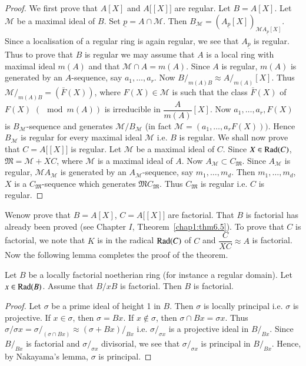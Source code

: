 \begin{proof}
We first prove that $A [X] $ and $A \big[[X]\big]$ are regular. Let
$B = A [X]$. Let $\mathscr{M}$ be a maximal ideal of
$B$. Set $\underline{p}= A \cap \mathscr{M}$. Then $B_\mathscr{M} =
(A_{\underline{p}} [X])_{\mathscr{M} A_{\underline{p}}[X]}$. Since a
localisation of a regular ring  is again regular, we see that
$A_{\underline{p}}$ is regular. Thus to prove that $B$ is regular we
may assume  that $A$ is a local ring with maximal ideal $m(A)$  and
that $\mathscr{M} \cap A = m(A)$. Since $A$ is regular, $m(A)$ is
generated by  an $A$-sequence, say $a_1, \ldots, a_r$. Now
$B/_{m(A)B} \approx A/_{m(A)} [X]$. Thus $\mathscr{M}/_{m (A)
    B} = (\bar{F}(X))$, where $F (X) \in \mathscr{M}$ is such that the
class $\bar{F}(X)$ of  $F(X)$ $(\mod m (A))$ is irreducible in
$\dfrac{A}{m (A)} [X]$. Now $a_1, \ldots , a_r, F(X)$ is
$B_\mathscr{M}$-sequence and generates $\mathscr{M} / B_\mathscr{M}$
(in fact $\mathscr{M}= (a_1, \ldots , a_r F(X)))$. Hence
$B_\mathscr{M}$ is regular for every maximal ideal $\mathscr{M}$
i.e. $B$ is regular. We shall now prove that $C = A \big[[X]\big]$ is
regular. Let $\mathscr{M}$ be a maximal ideal of $C$. Since $X \in
\operatorname{Rad} (C)$, $\mathfrak{M} = \mathscr{M} + X C$, where $\mathscr{M}$ is a
maximal ideal of $A$. Now $A_\mathscr{M} \subset
C_{\mathfrak{M}}$. Since $A_\mathscr{M}$ is regular, $\mathscr{M}
A_\mathscr{M}$ is generated by an $A_\mathscr{M}$-sequence, say $m_1,
\ldots , m_d$. Then $m_1, \ldots , m_d$, $X$ is a 
$C_\mathfrak{M}$-sequence which generates $\mathfrak{M}
C_\mathfrak{M}$. Thus $C_\mathfrak{M}$ is regular i.e. $C$ is
regular. 
    \end{proof}    
    
    We\pageoriginale now prove that $B = A [X]$, $C = A \big[[X]\big]$ are
    factorial. That $B$ is factorial has already been proved (see
    Chapter $I$, Theorem~\ref{chap1:thm6.5}). To prove that $C$ is factorial, we
    note that $K$ is in the radical $\operatorname{Rad} (C)$ of $C$ and $\dfrac{C}{X
      C} \approx A$ is factorial. Now the following lemma completes
    the proof of the theorem. 
    
\setcounter{lemma}{1}
\begin{lemma}\label{chap2:lem2.2} %
Let $B$ be a locally factorial noetherian ring (for instance a regular
domain). Let $x \in \operatorname{Rad} (B)$. Assume that $B/{xB}$ is
factorial. Then $B$ is factorial. 
\end{lemma}    

\begin{proof}
Let $\sigma$ be a prime ideal of height 1 in $B$. Then $\sigma$ is
locally principal i.e. $\sigma$ is projective. If $x \in \sigma$, then
$\sigma = Bx$. If $x \notin \sigma$, then $\sigma \cap Bx = \sigma
x$. Thus $\sigma/\sigma x = \sigma{/_{(\sigma \cap Bx)}} \approx
(\sigma + Bx){/_{Bx}}$ i.e. $\sigma /_{\sigma x}$ is a projective
ideal in $B/_{Bx}$. Since $B/_{Bx}$ is factorial and $\sigma/_{\sigma
  x}$ divisorial, we see that $\sigma{/_{\sigma x}}$ is principal in
$B/_{Bx}$. Hence, by Nakayama's lemma, $\sigma$ is principal. 
\end{proof}  
      
